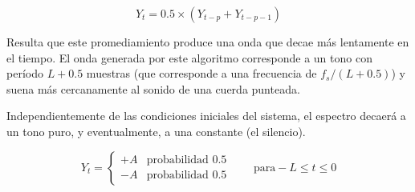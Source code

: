 \begin{equation}
    Y_t = 0.5\times \left(Y_{t-p}+Y_{t-p-1}\right)
    \label{eq:KS_avg}
\end{equation}

Resulta que este promediamiento produce una onda que decae más lentamente en el tiempo. El onda generada por este algoritmo corresponde a un tono con período $L + 0.5$ muestras (que corresponde a una frecuencia de $f_s / (L+0.5)$) y suena más cercanamente al sonido de una cuerda punteada.

Independientemente de las condiciones iniciales del sistema, el espectro decaerá a un tono puro, y eventualmente, a una constante (el silencio).

\begin{equation}
    Y_t = 
    \begin{cases}
        +A  &   \text{probabilidad 0.5}\\
        -A  &   \text{probabilidad 0.5}
    \end{cases}
    \qquad  \text{para} -L\leq t \leq 0
\end{equation}


